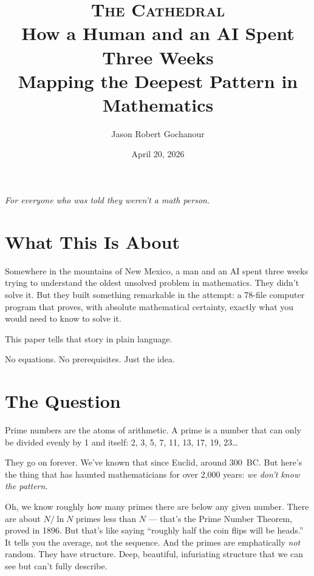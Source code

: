 \documentclass[12pt,a4paper]{article}
\title{%
  \vspace{-1cm}
  {\Large\textsc{The Cathedral}}\\[0.3cm]
  {\large How a Human and an AI Spent Three Weeks\\
  Mapping the Deepest Pattern in Mathematics}%
}
\author{
  Jason Robert Gochanour
}
\date{April 20, 2026}
\begin{document}
\maketitle

\begin{center}
\emph{For everyone who was told they weren't a math person.}
\end{center}

\vspace{1cm}

\section*{What This Is About}

Somewhere in the mountains of New Mexico, a man and an AI spent three
weeks trying to understand the oldest unsolved problem in mathematics.
They didn't solve it. But they built something remarkable in the
attempt: a 78-file computer program that proves, with absolute
mathematical certainty, exactly what you would need to know to solve it.

This paper tells that story in plain language.

No equations. No prerequisites. Just the idea.

\section*{The Question}

Prime numbers are the atoms of arithmetic. A prime is a number that can
only be divided evenly by 1 and itself: 2, 3, 5, 7, 11, 13, 17, 19, 23\ldots

They go on forever. We've known that since Euclid, around 300~BC. But
here's the thing that has haunted mathematicians for over 2,000 years:
\emph{we don't know the pattern.}

Oh, we know roughly how many primes there are below any given number.
There are about $N / \ln N$ primes less than $N$ --- that's the
Prime Number Theorem, proved in 1896. But that's like saying ``roughly
half the coin flips will be heads.'' It tells you the average, not
the sequence. And the primes are emphatically \emph{not} random. They
have structure. Deep, beautiful, infuriating structure that we can see
but can't fully describe.
\end{document}

